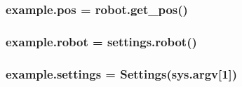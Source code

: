 \subsubsection[{\texorpdfstring{pos}{pos}}]{\setlength{\rightskip}{0pt plus 5cm}example.\+pos = robot.\+get\+\_\+pos()}\hypertarget{namespaceexample_a6d45a526abbb9e997551bc8421251383}{}\label{namespaceexample_a6d45a526abbb9e997551bc8421251383}
\subsubsection[{\texorpdfstring{robot}{robot}}]{\setlength{\rightskip}{0pt plus 5cm}example.\+robot = settings.\+robot()}\hypertarget{namespaceexample_aa3d3ac45bdbbaf45b505e0e8a34ad8c3}{}\label{namespaceexample_aa3d3ac45bdbbaf45b505e0e8a34ad8c3}
\subsubsection[{\texorpdfstring{settings}{settings}}]{\setlength{\rightskip}{0pt plus 5cm}example.\+settings = Settings(sys.\+argv\mbox{[}1\mbox{]})}\hypertarget{namespaceexample_a6cd613635d5a55d6581257e66788bc9f}{}\label{namespaceexample_a6cd613635d5a55d6581257e66788bc9f}
